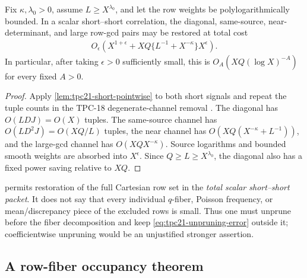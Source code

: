 \begin{proposition}
\label{prop:tpc21-scalar-unpruning}
Fix \(\kappa,\lambda_0>0\), assume \(L\ge X^{\lambda_0}\), and let the
row weights be polylogarithmically bounded.  In a scalar short--short
correlation, the diagonal, same-source, near-determinant, and large
row-gcd pairs may be restored at total cost
\begin{align}
 O_\epsilon\!\left(
 X^{1+\epsilon}
 +XQ\{L^{-1}+X^{-\kappa}\}X^\epsilon
 \right).
 \label{eq:tpc21-unpruning-error}
\end{align}
In particular, after taking \(\epsilon>0\) sufficiently small, this is
\(O_A(XQ(\log X)^{-A})\) for every fixed \(A>0\).
\end{proposition}

\begin{proof}
Apply \cref{lem:tpc21-short-pointwise} to both short signals and repeat
the tuple counts in the TPC-18 degenerate-channel removal
\citep{WangTPC18}.  The diagonal
has \(O(LDJ)=O(X)\) tuples.  The same-source channel has
\(O(LD^2J)=O(XQ/L)\) tuples, the near channel has
\(O(XQ(X^{-\kappa}+L^{-1}))\), and the large-gcd channel has
\(O(XQX^{-\kappa})\).  Source logarithms and bounded smooth weights are
absorbed into \(X^\epsilon\).  Since \(Q\ge L\ge X^{\lambda_0}\), the
diagonal also has a fixed power saving relative to \(XQ\).
\end{proof}

\begin{remark}
\label{rem:tpc21-unpruning-caveat}
 permits restoration of the full
Cartesian row set in the \emph{total scalar short--short packet}.  It
does not say that every individual \(q\)-fiber, Poisson frequency, or
mean/discrepancy piece of the excluded rows is small.  Thus one must
unprune before the fiber decomposition and keep
\eqref{eq:tpc21-unpruning-error} outside it; coefficientwise unpruning
would be an unjustified stronger assertion.
\end{remark}

\subsection{A row-fiber occupancy theorem}

